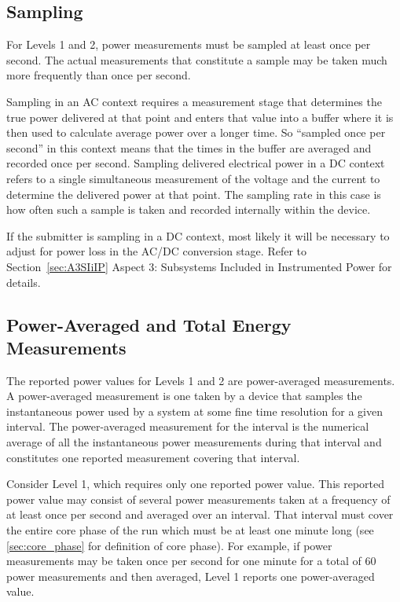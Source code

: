 \subsection{Sampling}
\noindent
For Levels 1 and 2, power measurements must be sampled at least once per second. The actual measurements that constitute a sample may be taken much more frequently than once per second. 
\wl

\noindent
Sampling in an AC context requires a measurement stage that determines the true power delivered at that point and enters that value into a buffer where it is then used to calculate average power over a longer time.  So ``sampled once per second'' in this context means that the times in the buffer are averaged and recorded once per second.
Sampling delivered electrical power in a DC context refers to a single simultaneous measurement of the voltage and the current to determine the delivered power at that point.  The sampling rate in this case is how often such a sample is taken and recorded internally within the device.  
\wl

\noindent
If the submitter is sampling in a DC context, most likely it will be necessary to adjust for power loss in the AC/DC conversion stage. 
Refer to Section~\ref{sec:A3SIiIP} Aspect 3: Subsystems Included in Instrumented Power for details.

\subsection{Power-Averaged and Total Energy Measurements}
\label{sec:PAaTEM}
\noindent
The reported power values for Levels 1 and 2 are power-averaged measurements. A power-averaged measurement is one taken by a device that samples the instantaneous power used by a system at some fine time resolution for a given interval. The power-averaged measurement for the interval is the numerical average of all the instantaneous power measurements during that interval and constitutes one reported measurement covering that interval. 
\wl

\noindent
Consider Level 1, which requires only one reported power value. 
This reported power value may consist of several power measurements taken at a frequency of at least once per second and averaged over an interval. 
That interval must cover the entire core phase of the run which must be at least one minute long (see \ref{sec:core_phase} for definition of core phase).
For example, if power measurements may be taken once per second for one minute for a total of 60 power measurements and then averaged, Level 1 reports one power-averaged value.
\wl

